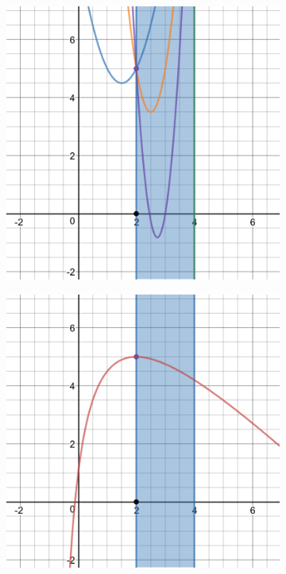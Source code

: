 \documentclass[12pt]{article}
\begin{document}
\begin{figure}[h]
    \begin{subfigure}[h]{0.5\textwidth}
        \centering
        \includegraphics[scale=.25]{1b.png}
    \end{subfigure}
    \begin{subfigure}[h]{0.5\textwidth}
        \centering
        \includegraphics[scale=.25]{1b_2.png}
    \end{subfigure}
\end{figure}
\end{document}

